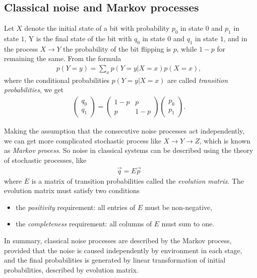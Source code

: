 \documentclass{article}
\begin{document}
\subsection{Classical noise and Markov processes}
Let $X$ denote the initial state of a bit with probability $p_0$ in state $0$ and $p_1$ in state $1$, Y is the final state of the bit with $q_0$ in state $0$ and $q_1$ in state $1$, and in the process $X\rightarrow Y$ the probability of the bit flipping is $p$, while $1-p$ for remaining the same. From the formula 
\begin{align}
	p(Y=y)=\sum_{x} p(Y=y|X=x)p(X=x),
\end{align}
where the conditional probabilities $p(Y=y|X=x)$ are called \textit{transition probabilities},
we get
\begin{align}
	\left( \begin{array}{c} q_0\\ q_1 \end{array} \right)
	= \left( \begin{array}{cc} 1-p&p\\ p&1-p \end{array} \right)
	\left( \begin{array}{c} p_0\\ p_1 \end{array} \right).
\end{align}

Making the assumption that the consecutive noise processes act independently, we can get more complicated stochastic process like $X\rightarrow Y\rightarrow Z$, which is known as \textit{Markov process}. So noise in classical systems can be described using the theory of stochastic processes, like
\begin{align}
	\vec{q}=E\vec{p} \label{classical_evolution}
\end{align}
where $E$ is a matrix of transition probabilities called the \textit{evolution matrix}. The evolution matrix must satisfy two conditions
\begin{itemize}
	\item the \textit{positivity} requirement: all entries of $E$ must be non-negative,
	\item the \textit{completeness} requirement: all columns of $E$ must sum to one.
\end{itemize}

In summary, classical noise processes are described by the Markov process, provided that the noise is caused independently by environment in each stage, and the final probabilities is generated by linear transformation of initial probabilities, described by evolution matrix.
\end{document}
